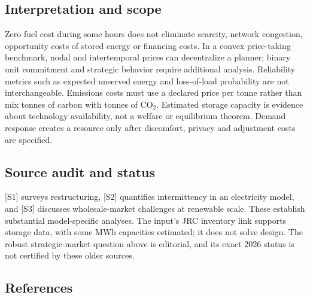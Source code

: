 \documentclass[11pt,a4paper]{article}
\begin{document}
\subsection*{Interpretation and scope}

Zero fuel cost during some hours does not eliminate scarcity, network congestion, opportunity costs of stored energy or financing costs. In a convex price-taking benchmark, nodal and intertemporal prices can decentralize a planner; binary unit commitment and strategic behavior require additional analysis. Reliability metrics such as expected unserved energy and loss-of-load probability are not interchangeable. Emissions costs must use a declared price per tonne rather than mix tonnes of carbon with tonnes of $\mathrm{CO}_2$. Estimated storage capacity is evidence about technology availability, not a welfare or equilibrium theorem. Demand response creates a resource only after discomfort, privacy and adjustment costs are specified.

\subsection*{Source audit and status}

[S1] surveys restructuring, [S2] quantifies intermittency in an electricity model, and [S3] discusses wholesale-market challenges at renewable scale. These establish substantial model-specific analyses. The input's JRC inventory link supports storage data, with some MWh capacities estimated; it does not solve design. The robust strategic-market question above is editorial, and its exact 2026 status is not certified by these older sources.

\subsection*{References}
\end{document}
